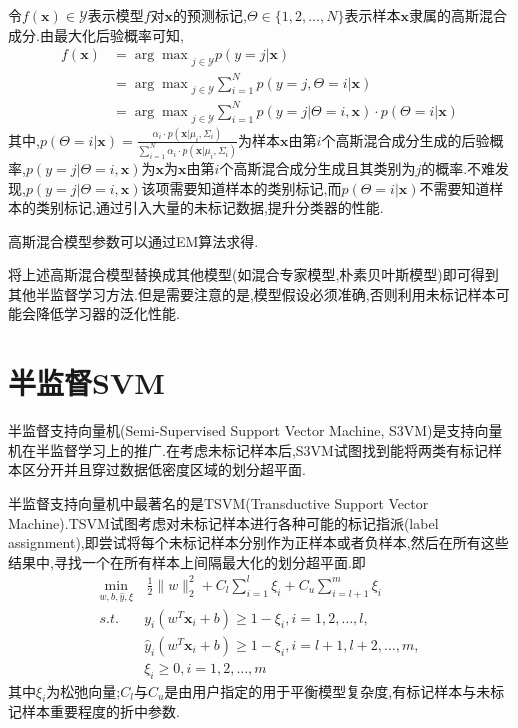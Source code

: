 令$f(\mathbf x)\in\mathcal{Y}$表示模型$f$对$\mathbf x$的预测标记,$\Theta\in\{1,2,\dots,N\}$表示样本$\mathbf x$隶属的高斯混合成分.由最大化后验概率可知,
\begin{equation}\begin{split}
f(\mathbf x)&={\arg\max}_{j\in\mathcal Y}p(y=j|\mathbf x)\\
&={\arg\max}_{j\in\mathcal Y}\sum_{i=1}^Np(y=j,\Theta=i|\mathbf x)\\
&={\arg\max}_{j\in\mathcal Y}\sum_{i=1}^Np(y=j|\Theta=i,\mathbf x)\cdot p(\Theta=i|\mathbf x)
\end{split}\end{equation}
其中,$p(\Theta=i|\mathbf x)=\frac{\alpha_i\cdot p(\mathbf x|\mu_i,\Sigma_i)}{\sum_{i=1}^N\alpha_i\cdot p(\mathbf x|\mu_i,\Sigma_i)}$为样本$\mathbf x$由第$i$个高斯混合成分生成的后验概率,$p(y=j|\Theta=i,\mathbf x)$为$\mathbf x$为$\mathbf x$由第$i$个高斯混合成分生成且其类别为$j$的概率.不难发现,$p(y=j|\Theta=i,\mathbf x)$该项需要知道样本的类别标记,而$p(\Theta=i|\mathbf x)$不需要知道样本的类别标记,通过引入大量的未标记数据,提升分类器的性能.

高斯混合模型参数可以通过EM算法求得.

将上述高斯混合模型替换成其他模型(如混合专家模型,朴素贝叶斯模型)即可得到其他半监督学习方法.但是需要注意的是,模型假设必须准确,否则利用未标记样本可能会降低学习器的泛化性能.

\section{半监督SVM}

半监督支持向量机(Semi-Supervised Support Vector Machine, S3VM)是支持向量机在半监督学习上的推广.在考虑未标记样本后,S3VM试图找到能将两类有标记样本区分开并且穿过数据低密度区域的划分超平面.

半监督支持向量机中最著名的是TSVM(Transductive Support Vector Machine).TSVM试图考虑对未标记样本进行各种可能的标记指派(label assignment),即尝试将每个未标记样本分别作为正样本或者负样本,然后在所有这些结果中,寻找一个在所有样本上间隔最大化的划分超平面.即
\begin{equation}\begin{split}
\min_{w,b,\hat y,\xi}&\,\frac{1}{2}\|w\|_2^2+C_l\sum_{i=1}^l\xi_i+C_u\sum_{i=l+1}^m\xi_i\\
s.t. &y_i(w^T\mathbf x_i+b)\ge1-\xi_i,i=1,2,\dots,l,\\
&\hat y_i(w^T\mathbf x_i+b)\ge1-\xi_i,i=l+1,l+2,\dots,m,\\
&\xi_i\ge 0,i=1,2,\dots,m
\end{split}\end{equation}
其中$\xi_i$为松弛向量;$C_l$与$C_u$是由用户指定的用于平衡模型复杂度,有标记样本与未标记样本重要程度的折中参数.

